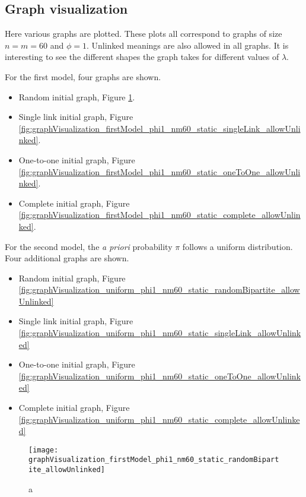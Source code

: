 \subsection{Graph visualization}
\label{sec:results_new_graph}

Here various graphs are plotted.
These plots all correspond to graphs of size $n=m=60$ and $\phi=1$.
Unlinked meanings are also allowed in all graphs.
It is interesting to see the different shapes the graph takes for different values of $\lambda$.

For the first model, four graphs are shown.

\begin{itemize}
\item Random initial graph, Figure \ref{fig:graphVisualization_firstModel_phi1_nm60_static_randomBipartite_allowUnlinked}.
\item Single link initial graph, Figure \ref{fig:graphVisualization_firstModel_phi1_nm60_static_singleLink_allowUnlinked}.
\item One-to-one initial graph, Figure \ref{fig:graphVisualization_firstModel_phi1_nm60_static_oneToOne_allowUnlinked}.
\item Complete initial graph, Figure \ref{fig:graphVisualization_firstModel_phi1_nm60_static_complete_allowUnlinked}.
\end{itemize}

For the second model, the \emph{a priori} probability $\pi$ follows a uniform distribution.
Four additional graphs are shown.

\begin{itemize}
\item Random initial graph, Figure \ref{fig:graphVisualization_uniform_phi1_nm60_static_randomBipartite_allowUnlinked}
\item Single link initial graph, Figure \ref{fig:graphVisualization_uniform_phi1_nm60_static_singleLink_allowUnlinked}
\item One-to-one initial graph, Figure \ref{fig:graphVisualization_uniform_phi1_nm60_static_oneToOne_allowUnlinked}
\item Complete initial graph, Figure \ref{fig:graphVisualization_uniform_phi1_nm60_static_complete_allowUnlinked}
\end{itemize}

\begin{figure}
  \centering
  \texttt{[image: graphVisualization\_firstModel\_phi1\_nm60\_static\_randomBipartite\_allowUnlinked]}
  \caption{a}
  \label{fig:graphVisualization_firstModel_phi1_nm60_static_randomBipartite_allowUnlinked}
\end{figure}

